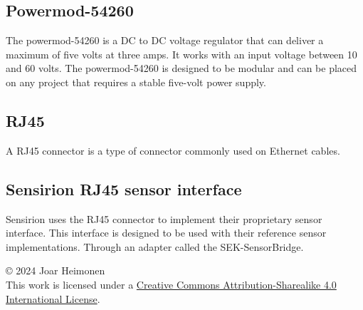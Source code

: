 \documentclass[12pt]{article}
\newcommand{\license}{
    \vspace{1em}
    \noindent\small{© 2024 Joar Heimonen\\
    This work is licensed under a \href{https://creativecommons.org/licenses/by-sa/4.0/}{Creative Commons Attribution-Sharealike 4.0 International License}.}
    \vspace{1em}
}
\begin{document}
\subsection{Powermod-54260}
The powermod-54260 is a DC to DC voltage regulator that can deliver a maximum of five volts at three amps.
It works with an input voltage between 10 and 60 volts. The powermod-54260 is designed to be modular and
can be placed on any project that requires a stable five-volt power supply.

\subsection{RJ45}
A RJ45 connector is a type of connector commonly used on Ethernet cables.

\subsection{Sensirion RJ45 sensor interface}
Sensirion uses the RJ45 connector to implement their proprietary sensor interface.
This interface is designed to be used with their reference sensor implementations. Through 
an adapter called the SEK-SensorBridge.

\pagebreak
{}
\printbibliography
\license
\end{document}
